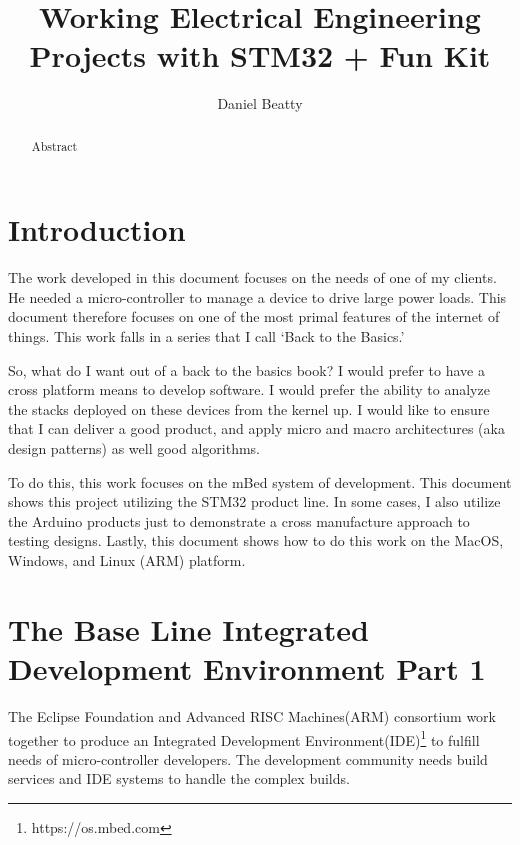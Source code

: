 \documentclass{article}
\title{Working Electrical Engineering Projects with STM32 + Fun Kit}
\author{Daniel Beatty}
\begin{document}
\maketitle

\begin{abstract}
    Abstract
\end{abstract}

\section{Introduction}

The work developed in this document focuses on the needs of one of my clients.  He needed a micro-controller to manage a device to drive large power loads.  This document therefore focuses on one of the most primal features of the internet of things.  This work falls in a series that I call `Back to the Basics.'

So, what do I want out of a back to the basics book?  
I would prefer to have a cross platform means to develop software. I would prefer the ability to analyze the stacks deployed on these devices from the kernel up.  I would like to ensure that I can deliver a good product, and apply micro and macro architectures (aka design patterns) as well good algorithms.  

To do this, this work focuses on the mBed system of development.  This document shows this project utilizing the STM32 product line.  In some cases, I also utilize the Arduino products just to demonstrate a cross manufacture approach to testing designs.  Lastly, this document shows how to do this work on the MacOS, Windows, and Linux (ARM) platform.  


\newpage
\section{The Base Line Integrated Development Environment Part 1} %
\label{sec:the_base_line_integrated_development_environment_part_1}

The Eclipse Foundation and Advanced RISC Machines(ARM) consortium work together to produce an Integrated Development Environment(IDE)\footnote{https://os.mbed.com} to fulfill needs of micro-controller developers.  The development community needs build services and IDE systems to handle the complex builds. %
\end{document}
